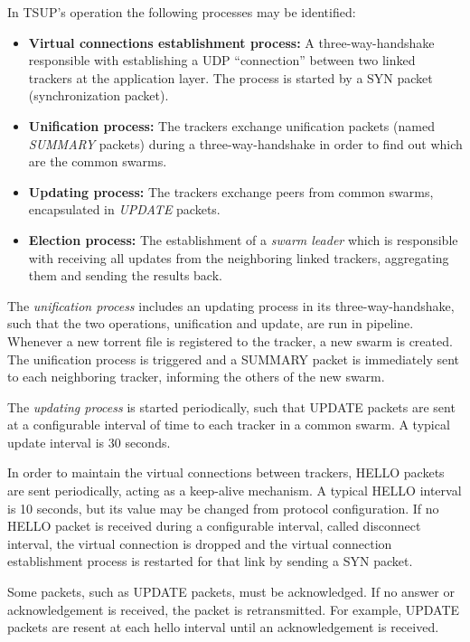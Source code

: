 In TSUP's operation the following processes may be identified:
\begin{itemize}
    \item \textbf{Virtual connections establishment process:} A
    three-way-handshake responsible with establishing a UDP ``connection''
    between two linked trackers at the application layer. The process is
    started by a SYN packet (synchronization packet).
    \item \textbf{Unification process:} The trackers exchange unification
    packets (named \textit{SUMMARY} packets) during a three-way-handshake in
    order to find out which are the common swarms.
    \item \textbf{Updating process:} The trackers exchange peers from common
    swarms, encapsulated in \textit{UPDATE} packets.
    \item \textbf{Election process:} The establishment of a \textit{swarm
    leader} which is responsible with receiving all updates from the
    neighboring linked trackers, aggregating them and sending the results
    back.
\end{itemize}

The \textit{unification process} includes an updating process in its
three-way-handshake, such that the two operations, unification and update, are
run in pipeline. Whenever a new torrent file is registered to the tracker, a
new swarm is created. The unification process is triggered and a SUMMARY
packet is immediately sent to each neighboring tracker, informing the others of the new swarm.

The \textit{updating process} is started periodically, such that UPDATE
packets are sent at a configurable interval of time to each tracker in a
common swarm. A typical update interval is 30 seconds.

In order to maintain the virtual connections between trackers, HELLO packets
are sent periodically, acting as a keep-alive mechanism. A typical HELLO
interval is 10 seconds, but its value may be changed from protocol
configuration. If no HELLO packet is received during a configurable interval,
called disconnect interval, the virtual connection is dropped and the virtual
connection establishment process is restarted for that link by sending a SYN
packet.

Some packets, such as UPDATE packets, must be acknowledged. If no answer or
acknowledgement is received, the packet is retransmitted. For example, UPDATE
packets are resent at each hello interval until an acknowledgement is received.

